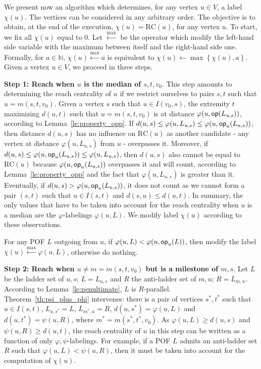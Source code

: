 \documentclass[a4paper,UKenglish,numberwithinsect,cleveref, autoref,anonymous]{lipics-v2021}
\newcommand{\set}[1]{\left\{ #1 \right\}}
\newcommand{\opp}{\mbox{\textsf{op}}}
\newcommand{\rc}{\mbox{RC}}
\begin{document}
We present now an algorithm which determines, for any vertex $u \in V$, a label $\chi(u)$. The vertices can be considered in any arbitrary order. The objective is to obtain, at the end of the execution, $\chi(u) = \rc(u)$, for any vertex $u$. To start, we fix all $\chi(u)$ equal to 0. Let $\xleftarrow{\max}$ be the operator which modify the left-hand side variable with the maximum between itself and the right-hand side one. Formally, for $a \in \mathbb{N}$, $\chi(u) \xleftarrow{\max} a$ is equivalent to $\chi(u) \leftarrow \max \set{\chi(u),a}$. Given a vertex $u \in V$, we proceed in three steps.

\textbf{Step 1: Reach when $u$ is the median of $s,t,v_0$}. This step amounts to determining the reach centrality of $u$ if we restrict ourselves to pairs $s,t$ such that $u = m(s,t,v_0)$. Given a vertex $s$ such that $u \in I(v_0,s)$, the extremity $t$ maximizing $d(u,t)$ such that $u = m(s,t,v_0)$ is at distance $\varphi(u,\opp(L_{u,s}))$, according to Lemma~\ref{le:property_opp}. If $d(u,s) \le \varphi(u,L_{u,s}) \le \varphi(u,\opp_u(L_{u,s}))$, then distance $d(u,s)$ has no influence on $\rc(u)$ as another candidate - any vertex at distance $\varphi(u,L_{u,s})$ from $u$ - overpasses it. Moreover, if $d(u,s) \le \varphi(u,\opp_u(L_{u,s})) \le \varphi(u,L_{u,s})$, then $d(u,s)$ also cannot be equal to $\rc(u)$ because $\varphi(u,\opp_u(L_{u,s}))$ overpasses it and will count, according to Lemma~\ref{le:property_opp} and the fact that $\varphi(u,L_{u,s})$ is greater than it. Eventually, if $d(u,s) > \varphi(u,\opp_u(L_{u,s}))$, it does not count as we cannot form a pair $(s,t)$ such that $u\in I(s,t)$ and $d(s,u) \le d(u,t)$. In summary, the only values that have to be taken into account for the reach centrality when $u$ is a median are the $\varphi$-labelings $\varphi(u,L)$. We modify label $\chi(u)$ according to these observations.

For any POF $L$ outgoing from $u$, if $\varphi(u,L) < \varphi(u,\opp_u(L))$, then modify the label $\chi(u) \xleftarrow{\max} \varphi(u,L)$, otherwise do nothing.

\textbf{Step 2: Reach when $u\neq m=m(s,t,v_0)$ but is a milestone of $m,s$}. Let $L$ be the ladder set of $u,s$; $L = L_{u,s}$ and $R$ the anti-ladder set of $m,u$; $R = \overline{L}_{m,u}$. According to Lemma~\ref{le:penultimate}, $L$ is $R$-parallel. Theorem~\ref{th:psi_plus_phi} intervenes: there is a pair of vertices $s^*,t^*$ such that $u \in I(s,t)$, $L_{u,s^*} = L$, $\overline{L}_{m^*,u} = R$, $d(u,s^*) = \varphi(u,L)$ and $d(u,t^*) = \psi(u,R)$, where $m^* = m(s^*,t^*,v_0)$. As $\varphi(u,L) \ge d(u,s)$ and $\psi(u,R) \ge d(u,t)$, the  reach centrality of $u$ in this step can be written as a function of only  $\varphi,\psi$-labelings. For example, if a POF $L$ admits an anti-ladder set $R$ such that $\varphi(u,L) < \psi(u,R)$, then it must be taken into account for the computation of $\chi(u)$.
\end{document}
